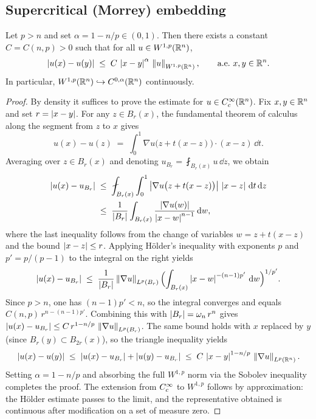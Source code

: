 \subsection{Supercritical (Morrey) embedding}

\begin{theorem}%
  \label{thm:sobolev-morrey}
  Let $p > n$ and set $\alpha = 1 - n/p \in (0, 1)$.  Then there exists a constant
  $C = C(n, p) > 0$ such that for all $u \in W^{1,p}(\mathbb{R}^{n})$,
  \begin{equation}\label{eq:morrey}
    \left\lvert u(x) - u(y) \right\rvert
    \;\le\;
    C\,\left\lvert x - y \right\rvert^{\alpha}\,\left\lVert u \right\rVert_{W^{1,p}(\mathbb{R}^{n})},
    \qquad \text{a.e.\ } x, y \in \mathbb{R}^{n}.
  \end{equation}
  In particular, $W^{1,p}(\mathbb{R}^{n}) \hookrightarrow C^{0,\alpha}(\mathbb{R}^{n})$ continuously.
\end{theorem}

\begin{proof}
  By density it suffices to prove the estimate for $u \in C^\infty_c(\mathbb{R}^{n})$.  Fix
  $x, y \in \mathbb{R}^{n}$ and set $r = \left\lvert x - y \right\rvert$.  For any $z \in B_{r}(x)$, the
  fundamental theorem of calculus along the segment from $z$ to $x$ gives
  \[
    u(x) - u(z)
    \;=\;
    \int_{0}^{1} \nabla u\bigl(z + t(x - z)\bigr) \cdot (x - z)\,\dd t.
  \]
  Averaging over $z \in B_{r}(x)$ and denoting $u_{B_{r}} = \fint_{B_{r}(x)} u\,\dd z$,
  we obtain
  \begin{align*}
    \abs{u(x) - u_{B_{r}}}
    &\;\le\;
    \fint_{B_{r}(x)} \int_{0}^{1}
      \abs{\nabla u\bigl(z + t(x-z)\bigr)}\,\abs{x - z}\,\dd t\,\dd z \\
    &\;\le\;
    \frac{1}{\abs{B_{r}}}
    \int_{B_{r}(x)} \frac{\abs{\nabla u(w)}}{\abs{x - w}^{n-1}}\,\dd w,
  \end{align*}
  where the last inequality follows from the change of variables $w = z + t(x - z)$ and
  the bound $\left\lvert x - z \right\rvert \le r$.  Applying H\"{o}lder's inequality with exponents $p$
  and $p' = p/(p-1)$ to the integral on the right yields
  \[
    \left\lvert u(x) - u_{B_{r}} \right\rvert
    \;\le\;
    \frac{1}{\left\lvert B_{r} \right\rvert}
    \left\lVert \nabla u \right\rVert_{L^{p}(B_{r})}
    \Bigl(\int_{B_{r}(x)} \left\lvert x - w \right\rvert^{-(n-1)p'}\,\mathrm{d} w\Bigr)^{1/p'}.
  \]
  Since $p > n$, one has $(n-1)p' < n$, so the integral converges and equals
  $C(n,p)\,r^{n - (n-1)p'}$.  Combining this with $\left\lvert B_{r} \right\rvert = \omega_{n}\,r^{n}$
  gives $\left\lvert u(x) - u_{B_{r}} \right\rvert \le C\,r^{1 - n/p}\,\left\lVert \nabla u \right\rVert_{L^{p}(B_{r})}$.
  The same bound holds with $x$ replaced by $y$ (since $B_{r}(y) \subset B_{2r}(x)$),
  so the triangle inequality yields
  \[
    \left\lvert u(x) - u(y) \right\rvert
    \;\le\;
    \left\lvert u(x) - u_{B_{r}} \right\rvert + \left\lvert u(y) - u_{B_{r}} \right\rvert
    \;\le\;
    C\,\left\lvert x - y \right\rvert^{1 - n/p}\,\left\lVert \nabla u \right\rVert_{L^{p}(\mathbb{R}^{n})}.
  \]
  Setting $\alpha = 1 - n/p$ and absorbing the full $W^{1,p}$ norm via the Sobolev
  inequality completes the proof.  The extension from $C^\infty_c$ to $W^{1,p}$ follows by
  approximation: the H\"{o}lder estimate passes to the limit, and the representative
  obtained is continuous after modification on a set of measure zero.
\end{proof}

